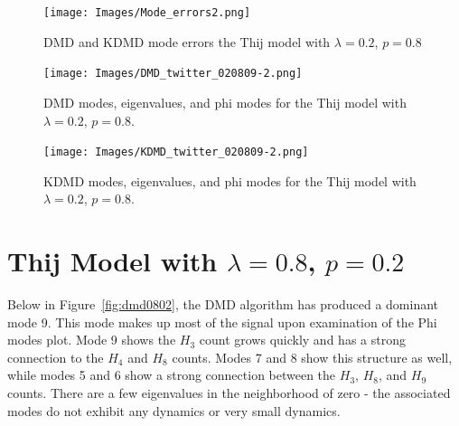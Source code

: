 \begin{figure}
    \texttt{[image: Images/Mode\_errors2.png]}
    \centering
    \caption{DMD and KDMD mode errors the Thij model with $\lambda=0.2$, $p=0.8$ \label{fig:0208modeerrors}}
\end{figure}


\clearpage

\begin{figure}
    \texttt{[image: Images/DMD\_twitter\_020809-2.png]}
    \centering
    \caption{DMD modes, eigenvalues, and phi modes for the Thij model
    with $\lambda=0.2$, $p=0.8$.}
    \label{fig:dmd0208}
\end{figure}



\begin{figure}
    \texttt{[image: Images/KDMD\_twitter\_020809-2.png]}
    \centering
    \caption{ KDMD modes, eigenvalues, and phi modes for the Thij model
    with $\lambda=0.2$, $p=0.8$.}
    \label{fig:kdmd0208}
\end{figure}

\FloatBarrier

\section{Thij Model with \texorpdfstring{$\lambda=0.8$, $p=0.2$}{l=0.8, p=0.2}}
Below in Figure~\ref{fig:dmd0802}, the DMD algorithm has produced a dominant mode
9. This mode makes up most of the signal upon examination of the Phi modes plot. Mode
9 shows the $H_{3}$ count grows quickly and has a strong connection to the $H_{4}$ and $H_{8}$ counts. Modes
7 and 8 show this structure as well, while modes 5 and 6 show a strong connection between the 
$H_{3}$, $H_{8}$, and $H_{9}$ counts. There are a few eigenvalues in the neighborhood of zero -  
the associated modes do not exhibit any dynamics or very small dynamics. 

